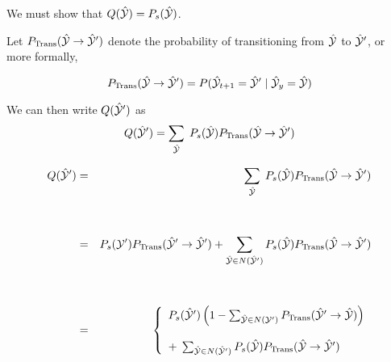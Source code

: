 {\vfill
We must show that $Q(\hat{\cal Y}) = P_s(\hat{\cal Y})$.

Let $P_{\mathrm{Trans}}(\hat{\cal Y} \rightarrow \hat{\cal Y}')$ denote the probability of transitioning from $\hat{\cal Y}$ to $\hat{\cal Y}'$, or more formally,

\vfill
$$P_{\mathrm{Trans}}(\hat{\cal Y} \rightarrow \hat{\cal Y}') = P(\hat{\cal Y}_{t+1} = \hat{\cal Y}'\;|\; \hat{\cal Y}_y = \hat{\cal Y})$$

\vfill
We can then write $Q(\hat{\cal Y}')$ as
\vfill
$$Q(\hat{\cal Y}') =  \sum_{\hat{\cal Y}}\;P_s(\hat{\cal Y})P_\mathrm{Trans}(\hat{\cal Y} \rightarrow \hat{\cal Y}')$$


{\huge
\begin{eqnarray*}
Q(\hat{\cal Y}')& = &  \sum_{\hat{\cal Y}}\;P_s(\hat{\cal Y})P_\mathrm{Trans}(\hat{\cal Y} \rightarrow \hat{\cal Y}') \\
\\
\\
& = & P_s({\cal Y'})P_\mathrm{Trans}(\hat{\cal Y}' \rightarrow \hat{\cal Y}') + \sum_{\hat{\cal Y} \in N(\hat{\cal Y}')} P_s(\hat{\cal Y}){P_{\mathrm{Trans}}(\hat{\cal Y} \rightarrow \hat{\cal Y}')} \\
\\
\\
& = & \left\{\begin{array}{l}P_s(\hat{\cal Y}')\left(1-\sum_{\hat{\cal Y} \in N({\cal Y'})} P_\mathrm{Trans}(\hat{\cal Y}'\rightarrow \hat{\cal Y})\right) \\
\\
  + \; \sum_{\hat{\cal Y} \in N(\hat{\cal Y}')} P_s(\hat{\cal Y}){P_{\mathrm{Trans}}(\hat{\cal Y} \rightarrow \hat{\cal Y}')}\end{array}\right.
\end{eqnarray*}
}


}
